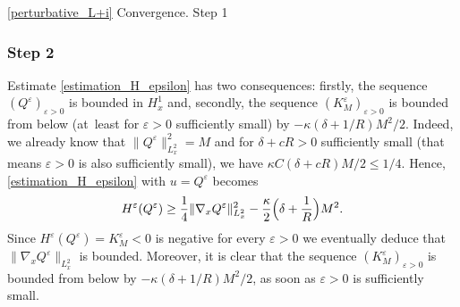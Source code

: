 \begin{ProofOf}{\eqref{perturbative_L+i} Convergence. Step 1}
\subsubsection*{Step 2} Estimate \eqref{estimation_H_epsilon} has two consequences: firstly, the sequence $(Q^{\varepsilon})_{\varepsilon>0}$ is bounded in $H_{x}^{1}$ and, secondly, the sequence $(K_{M}^{\varepsilon})_{\varepsilon>0}$ is bounded from below (at~least for $\varepsilon>0$ sufficiently small) by $-\kappa(\delta+1/R)M^{2}/2$. Indeed, we already know that $\|Q^{\varepsilon}\|_{L_{x}^{2}}^{2}=M$ and for $\delta+cR>0$ sufficiently small (that means $\varepsilon>0$ is also sufficiently small), we have $\kappa C(\delta+cR)M/2\leq 1/4$. Hence, \eqref{estimation_H_epsilon} with $u=Q^{\varepsilon}$ becomes
\[
H^{\varepsilon}(Q^{\varepsilon})\geq\frac{1}{4}\|\nabla_{x}Q^{\varepsilon}\|_{L_{x}^{2}}^{2}-\frac{\kappa}{2}\Bigl(\delta+\frac{1}{R}\Bigr)M^{2}.
\]
Since $H^{\varepsilon}(Q^{\varepsilon})=K_{M}^{\varepsilon}<0$ is negative for every $\varepsilon>0$ we eventually deduce that $\|\nabla_{x}Q^{\varepsilon}\|_{L_{x}^{2}}$ is bounded. Moreover, it is clear that the sequence $(K_{M}^{\varepsilon})_{\varepsilon>0}$ is bounded from below by $-\kappa(\delta+1/R)M^{2}/2$, as soon as $\varepsilon>0$ is sufficiently small.


\end{ProofOf}
